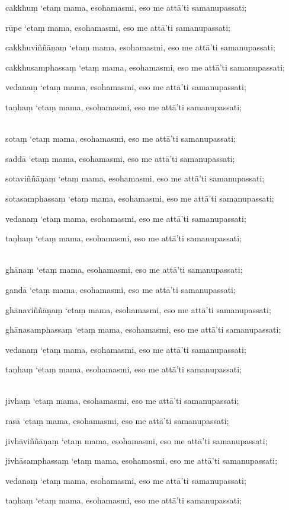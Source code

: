 \documentclass[9pt]{article}
\begin{document}
{\small{cakkhuṃ ‘etaṃ mama, esohamasmi, eso me attā’ti samanupassati;\

rūpe ‘etaṃ mama, esohamasmi, eso me attā’ti samanupassati;\

cakkhuviññāṇaṃ ‘etaṃ mama, esohamasmi, eso me attā’ti samanupassati;\

cakkhusamphassaṃ ‘etaṃ mama, esohamasmi, eso me attā’ti samanupassati;\

vedanaṃ ‘etaṃ mama, esohamasmi, eso me attā’ti samanupassati;\

taṇhaṃ ‘etaṃ mama, esohamasmi, eso me attā’ti samanupassati;\\\

sotaṃ ‘etaṃ mama, esohamasmi, eso me attā’ti samanupassati;\

saddā ‘etaṃ mama, esohamasmi, eso me attā’ti samanupassati;\

sotaviññāṇaṃ ‘etaṃ mama, esohamasmi, eso me attā’ti samanupassati;\

sotasamphassaṃ ‘etaṃ mama, esohamasmi, eso me attā’ti samanupassati;\

vedanaṃ ‘etaṃ mama, esohamasmi, eso me attā’ti samanupassati;\

taṇhaṃ ‘etaṃ mama, esohamasmi, eso me attā’ti samanupassati;\\\

ghānaṃ ‘etaṃ mama, esohamasmi, eso me attā’ti samanupassati;\

gandā ‘etaṃ mama, esohamasmi, eso me attā’ti samanupassati;\

ghānaviññāṇaṃ ‘etaṃ mama, esohamasmi, eso me attā’ti samanupassati;\

ghānasamphassaṃ ‘etaṃ mama, esohamasmi, eso me attā’ti samanupassati;\

vedanaṃ ‘etaṃ mama, esohamasmi, eso me attā’ti samanupassati;\

taṇhaṃ ‘etaṃ mama, esohamasmi, eso me attā’ti samanupassati;\\\

jivhaṃ ‘etaṃ mama, esohamasmi, eso me attā’ti samanupassati;\

rasā ‘etaṃ mama, esohamasmi, eso me attā’ti samanupassati;\

jivhāviññāṇaṃ ‘etaṃ mama, esohamasmi, eso me attā’ti samanupassati;\

jivhāsamphassaṃ ‘etaṃ mama, esohamasmi, eso me attā’ti samanupassati;\

vedanaṃ ‘etaṃ mama, esohamasmi, eso me attā’ti samanupassati;\

taṇhaṃ ‘etaṃ mama, esohamasmi, eso me attā’ti samanupassati;\\\

}}
\end{document}
